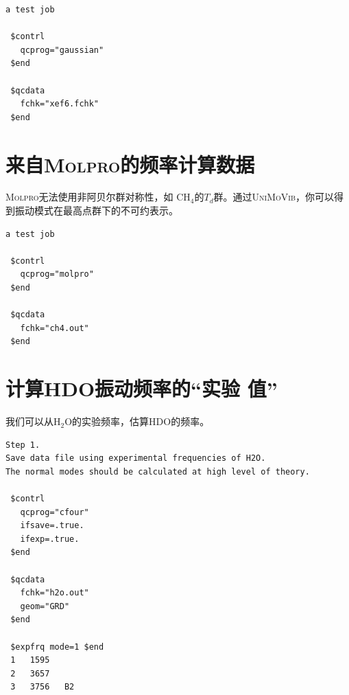 \documentclass[12pt,a4paper,openany,twoside,cap]{ctexbook}
\begin{document}
\begin{colorboxed}[oval=false,boxcolor=green!75!black,bgcolor=green!5!white]
\ttfamily\footnotesize
\begin{lstlisting}
a test job

 $contrl
   qcprog="gaussian"
 $end

 $qcdata
   fchk="xef6.fchk"
 $end
\end{lstlisting}\end{colorboxed}

\section{来自\textsc{Molpro}的频率计算数据} \label{sec:exp3}

\textsc{Molpro}无法使用非阿贝尔群对称性，如 CH$_4$的$T_d$群。通过\textsc{UniMoVib}，你可以得到振动模式在最高点群下的不可约表示。

\begin{colorboxed}[oval=false,boxcolor=green!75!black,bgcolor=green!5!white]
\ttfamily\footnotesize
\begin{lstlisting}
a test job

 $contrl
   qcprog="molpro"
 $end

 $qcdata
   fchk="ch4.out"
 $end
\end{lstlisting}\end{colorboxed}

\section{计算HDO振动频率的``实验 值''} \label{sec:exp4}

我们可以从H$_2$O的实验频率，估算HDO的频率。

\begin{colorboxed}[oval=false,boxcolor=green!75!black,bgcolor=green!5!white]
\ttfamily\footnotesize
\begin{lstlisting}
Step 1.
Save data file using experimental frequencies of H2O.
The normal modes should be calculated at high level of theory.

 $contrl
   qcprog="cfour"
   ifsave=.true.
   ifexp=.true.
 $end

 $qcdata
   fchk="h2o.out"
   geom="GRD"
 $end

 $expfrq mode=1 $end
 1   1595
 2   3657
 3   3756   B2
\end{lstlisting}\end{colorboxed}
\end{document}
